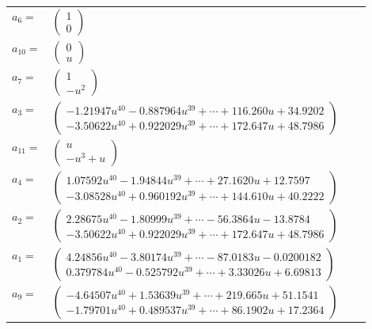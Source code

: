 \documentclass[1p]{elsarticle_modified}
\theoremstyle{definition}
\begin{document}
\begin{tabular}{m{7pt} m{180pt} m{7pt} m{180pt} }
\flushright $a_{6}=$&$\begin{pmatrix}1\\0\end{pmatrix}$ \\
\flushright $a_{10}=$&$\begin{pmatrix}0\\u\end{pmatrix}$ \\
\flushright $a_{7}=$&$\begin{pmatrix}1\\- u^2\end{pmatrix}$ \\
\flushright $a_{3}=$&$\begin{pmatrix}-1.21947 u^{40}-0.887964 u^{39}+\cdots+116.260 u+34.9202\\-3.50622 u^{40}+0.922029 u^{39}+\cdots+172.647 u+48.7986\end{pmatrix}$ \\
\flushright $a_{11}=$&$\begin{pmatrix}u\\- u^3+u\end{pmatrix}$ \\
\flushright $a_{4}=$&$\begin{pmatrix}1.07592 u^{40}-1.94844 u^{39}+\cdots+27.1620 u+12.7597\\-3.08528 u^{40}+0.960192 u^{39}+\cdots+144.610 u+40.2222\end{pmatrix}$ \\
\flushright $a_{2}=$&$\begin{pmatrix}2.28675 u^{40}-1.80999 u^{39}+\cdots-56.3864 u-13.8784\\-3.50622 u^{40}+0.922029 u^{39}+\cdots+172.647 u+48.7986\end{pmatrix}$ \\
\flushright $a_{1}=$&$\begin{pmatrix}4.24856 u^{40}-3.80174 u^{39}+\cdots-87.0183 u-0.0200182\\0.379784 u^{40}-0.525792 u^{39}+\cdots+3.33026 u+6.69813\end{pmatrix}$ \\
\flushright $a_{9}=$&$\begin{pmatrix}-4.64507 u^{40}+1.53639 u^{39}+\cdots+219.665 u+51.1541\\-1.79701 u^{40}+0.489537 u^{39}+\cdots+86.1902 u+17.2364\end{pmatrix}$ \\

\end{tabular}
\end{document}
